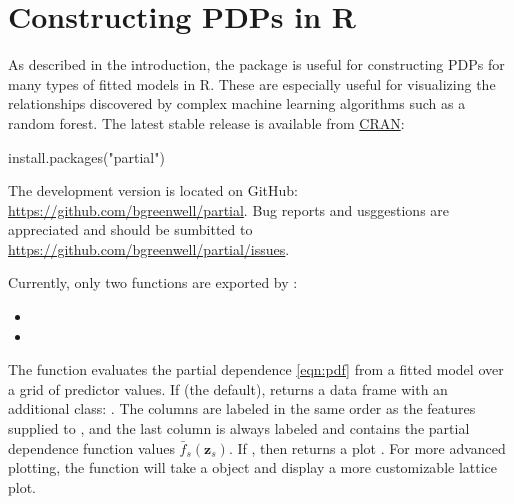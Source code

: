 \section{Constructing PDPs in R}

As described in the introduction, the  package is useful for constructing PDPs for many types of fitted models in R. These are especially useful for visualizing the relationships discovered by complex machine learning algorithms such as a random forest. The latest stable release is available from \href{https://cran.r-project.org/package=partial}{CRAN}:
\begin{example}
install.packages("partial")
\end{example}
The development version is located on GitHub: \url{https://github.com/bgreenwell/partial}. Bug reports and usggestions are appreciated and should be sumbitted to \url{https://github.com/bgreenwell/partial/issues}.

Currently, only two functions are exported by :
\begin{itemize}
  \item {}
  \item {}
\end{itemize}
The  function evaluates the partial dependence \eqref{eqn:pdf} from a fitted model over a grid of predictor values. If  (the default),  returns a data frame with an additional class: . The columns are labeled in the same order as the features supplied to , and the last column is always labeled  and contains the partial dependence function values $\bar{f}_s\left(\boldsymbol{z}_s\right)$. If , then  returns a  plot \citep{lattice-pkg}. For more advanced plotting, the  function will take a  object and display a more customizable lattice plot. 

